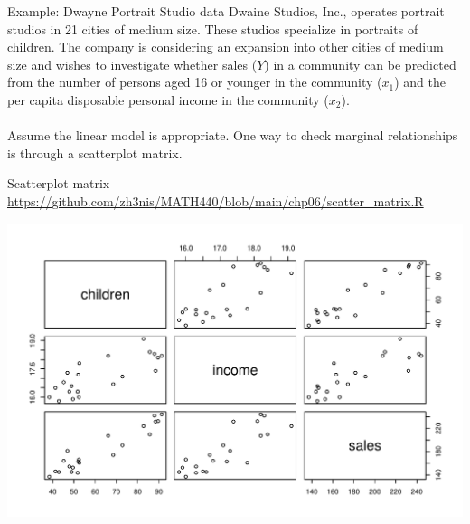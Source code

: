 \documentclass{beamer}
\begin{document}
\begin{frame}{Example: Dwayne Portrait Studio data}
Dwaine Studios, Inc., operates portrait studios in 21 cities of medium size. \pause These studios
specialize in portraits of children. \pause The company is considering an expansion into other
cities of medium size and wishes to investigate whether sales ($Y$) in a community can be
predicted from the number of persons aged 16 or younger in the community ($x_1$) and the
per capita disposable personal income in the community ($x_2$).\\~\\

Assume the linear model is appropriate. One way to check marginal relationships is through a scatterplot matrix. %


\end{frame}


\begin{frame}{Scatterplot matrix}
{\url{https://github.com/zh3nis/MATH440/blob/main/chp06/scatter_matrix.R}}

\centering\includegraphics[width=\textwidth]{plots/scatter_matrix.pdf}
\end{frame}
\end{document}
